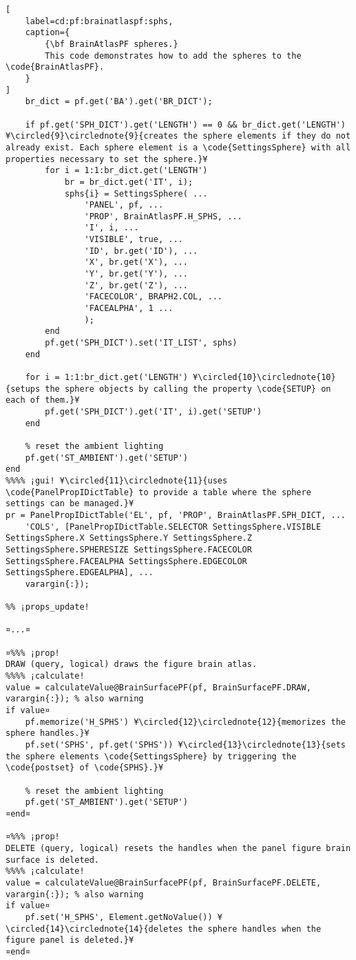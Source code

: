 \documentclass{tufte-handout}
\begin{document}
\begin{lstlisting}[
	label=cd:pf:brainatlaspf:sphs,
	caption={
		{\bf BrainAtlasPF spheres.}
		This code demonstrates how to add the spheres to the \code{BrainAtlasPF}.
	}
]
    br_dict = pf.get('BA').get('BR_DICT');
    
    if pf.get('SPH_DICT').get('LENGTH') == 0 && br_dict.get('LENGTH') ¥\circled{9}\circlednote{9}{creates the sphere elements if they do not already exist. Each sphere element is a \code{SettingsSphere} with all properties necessary to set the sphere.}¥
        for i = 1:1:br_dict.get('LENGTH')
            br = br_dict.get('IT', i);
            sphs{i} = SettingsSphere( ...
                'PANEL', pf, ...
                'PROP', BrainAtlasPF.H_SPHS, ...
                'I', i, ...
                'VISIBLE', true, ...
                'ID', br.get('ID'), ...
                'X', br.get('X'), ... 
                'Y', br.get('Y'), ...
                'Z', br.get('Z'), ...
                'FACECOLOR', BRAPH2.COL, ...
                'FACEALPHA', 1 ...
                );
        end
        pf.get('SPH_DICT').set('IT_LIST', sphs)
    end
    
    for i = 1:1:br_dict.get('LENGTH') ¥\circled{10}\circlednote{10}{setups the sphere objects by calling the property \code{SETUP} on each of them.}¥
        pf.get('SPH_DICT').get('IT', i).get('SETUP')
    end
    
    % reset the ambient lighting
    pf.get('ST_AMBIENT').get('SETUP')
end
%%%% ¡gui! ¥\circled{11}\circlednote{11}{uses \code{PanelPropIDictTable} to provide a table where the sphere settings can be managed.}¥
pr = PanelPropIDictTable('EL', pf, 'PROP', BrainAtlasPF.SPH_DICT, ...
    'COLS', [PanelPropIDictTable.SELECTOR SettingsSphere.VISIBLE SettingsSphere.X SettingsSphere.Y SettingsSphere.Z SettingsSphere.SPHERESIZE SettingsSphere.FACECOLOR SettingsSphere.FACEALPHA SettingsSphere.EDGECOLOR SettingsSphere.EDGEALPHA], ...
    varargin{:});

%% ¡props_update!

¤...¤

¤%%% ¡prop!
DRAW (query, logical) draws the figure brain atlas.
%%%% ¡calculate!
value = calculateValue@BrainSurfacePF(pf, BrainSurfacePF.DRAW, varargin{:}); % also warning
if value¤
    pf.memorize('H_SPHS') ¥\circled{12}\circlednote{12}{memorizes the sphere handles.}¥
    pf.set('SPHS', pf.get('SPHS')) ¥\circled{13}\circlednote{13}{sets the sphere elements \code{SettingsSphere} by triggering the \code{postset} of \code{SPHS}.}¥

    % reset the ambient lighting
    pf.get('ST_AMBIENT').get('SETUP')
¤end¤
    
¤%%% ¡prop!
DELETE (query, logical) resets the handles when the panel figure brain surface is deleted.
%%%% ¡calculate!
value = calculateValue@BrainSurfacePF(pf, BrainSurfacePF.DELETE, varargin{:}); % also warning
if value¤
    pf.set('H_SPHS', Element.getNoValue()) ¥\circled{14}\circlednote{14}{deletes the sphere handles when the figure panel is deleted.}¥
¤end¤


\end{lstlisting}
\end{document}
